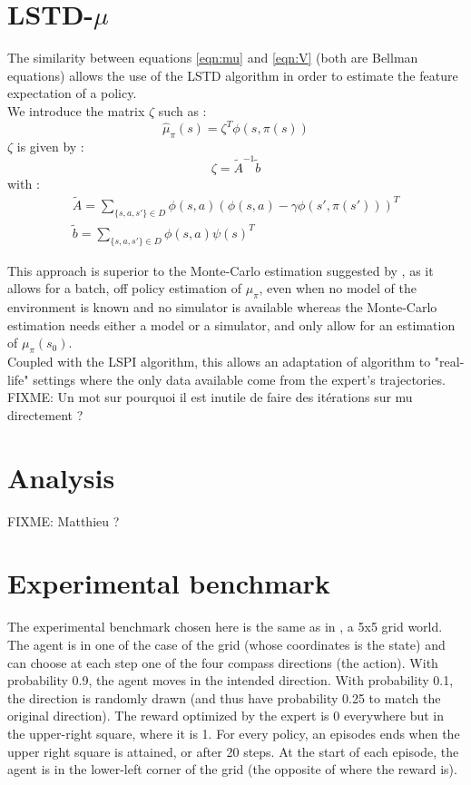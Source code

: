 \documentclass{article}
\begin{document}
\section{LSTD-$\mu$}
\label{sec:lstdmu}
The similarity between equations \ref{eqn:mu} and \ref{eqn:V} (both are Bellman equations) allows the use of the LSTD algorithm in order to estimate the feature expectation of a policy.\\

We introduce the matrix $\zeta$ such as :
\begin{equation}
\hat \mu_\pi (s) = \zeta^T\phi(s,\pi(s))
\end{equation}
$\zeta$ is given by :
\begin{equation}
\zeta = \tilde A^{-1}\tilde b
\end{equation}
with :
\begin{eqnarray}
\tilde A = \sum_{\{s,a,s'\} \in D}\phi(s,a)\left(\phi(s,a) - \gamma \phi(s',\pi(s'))\right)^T\\
\tilde b = \sum_{\{s,a,s'\} \in D} \phi(s,a)\psi(s)^T
\end{eqnarray}

This approach is superior to the Monte-Carlo estimation suggested by \citet{abbeel2004apprenticeship}, as it allows for a batch, off policy estimation of $\mu_\pi$, even when no model of the environment is known and no simulator is available whereas the Monte-Carlo estimation needs either a model or a simulator, and only allow for an estimation of $\mu_\pi(s_0)$.\\

Coupled with the LSPI algorithm, this allows an adaptation of \citet{abbeel2004apprenticeship} algorithm to "real-life" settings where the only data available come from the expert's trajectories.\\

FIXME: Un mot sur pourquoi il est inutile de faire des itérations sur mu directement ?

\section{Analysis}
FIXME: Matthieu ?
\section{Experimental benchmark}
\label{sec:exp}
The experimental benchmark chosen here is the same as in \citep{ng2000algorithms}, a 5x5 grid world. The agent is in one of the case of the grid (whose coordinates is the state) and can choose at each step one of the four compass directions (the action). With probability 0.9, the agent moves in the intended direction. With probability 0.1, the direction is randomly drawn (and thus have probability 0.25 to match the original direction). The reward optimized by the expert is 0 everywhere but in the upper-right square, where it is 1. For every policy, an episodes ends when the upper right square is attained, or after 20 steps. At the start of each episode, the agent is in the lower-left corner of the grid (the opposite of where the reward is).\\
\end{document}
